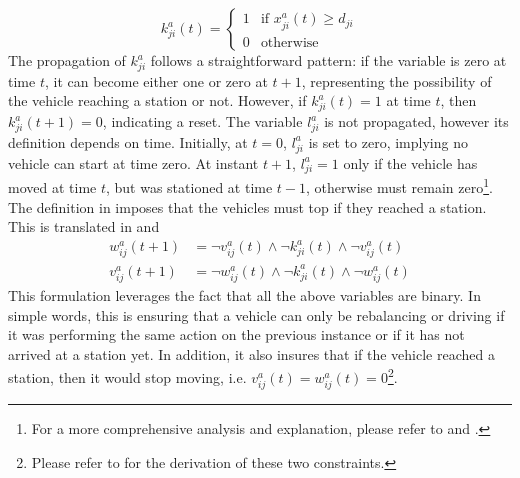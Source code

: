 \begin{equation}
	k^a_{ji}(t) =\begin{cases}
		1 & \text{if }x^a_{ji}(t) \ge d_{ji}\\
		0 & \text{otherwise}
	\end{cases}
	\label{eq:arrived_variable}
\end{equation}
The propagation of $k^a_{ji} $ follows a straightforward pattern: if the variable is zero at time $ t $, it can become either one or zero at $ t+1 $, representing the possibility of the vehicle reaching a station or not. However, if $ k^a_{ji}(t) = 1 $ at time $ t $, then $ k^a_{ji}(t+1) = 0 $, indicating a reset.  The variable $ l^a_{ji}$ is not propagated, however its definition depends on time. Initially, at $ t=0 $, $l^a_{ji} $ is set to zero, implying no vehicle can start at time zero. At instant $ t+1 $,  $l^a_{ji} = 1$ only if the vehicle has moved at time $t$, but was stationed at time $t-1$, otherwise must remain zero\footnote{For a more comprehensive analysis and explanation, please refer to  and . }. \\
The definition in  imposes that the vehicles must top if they reached a station. This is translated  in   and 
\begin{align}
	w_{ij}^a(t+1) &= \neg v^a_{ij}(t) \land \neg k^a_{ji}(t) \land \neg v^a_{ij}(t)  \label{eq:prop_w}\\
	v_{ij}^a(t+1) &= \neg w^a_{ij}(t) \land \neg k^a_{ji}(t) \land \neg w^a_{ij}(t) \label{eq:prop_v}
\end{align}
This formulation leverages the fact that all the above variables are binary. In simple words, this is ensuring that a vehicle can only be rebalancing or driving if it was performing the same action on the previous instance or if it has not arrived at a station yet. In addition, it also insures that if the vehicle reached a station, then it would stop moving, i.e. $v^a_{ij}(t)=w^a_{ij}(t)=0$\footnote{Please refer to  for the derivation of these two constraints.}. 


